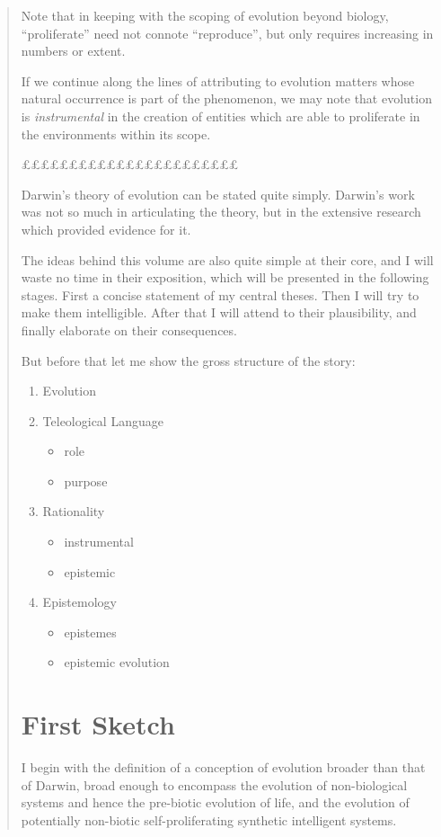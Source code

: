 {\begin{quote}
Note that in keeping with the scoping of evolution beyond biology, ``proliferate'' need not connote ``reproduce'', but only requires increasing in numbers or extent.

If we continue along the lines of attributing to evolution matters whose natural occurrence is part of the phenomenon, we may note that evolution is \emph{instrumental} in the creation of entities which are able to proliferate in the environments within its scope.

£££££££££££££££££££££££


Darwin's theory of evolution can be stated quite simply.
Darwin's work was not so much in articulating the theory, but in the extensive research which provided evidence for it.

The ideas behind this volume are also quite simple at their core, and I will waste no time in their exposition, which will be presented in the following stages.
First a concise statement of my central theses.
Then I will try to make them intelligible.
After that I will attend to their plausibility, and finally elaborate on their consequences.

But before that let me show the gross structure of the story:

\begin{enumerate}
\item Evolution
\item Teleological Language
\begin{itemize}
\item role
\item purpose
\end{itemize}
\item Rationality
\begin{itemize}
\item instrumental
\item epistemic
\end{itemize}
\item Epistemology
\begin{itemize}
\item epistemes
\item epistemic evolution
\end{itemize}
\end{enumerate}

\section{First Sketch}
I begin with the definition of a conception of evolution broader than that of Darwin, broad enough to encompass the evolution of non-biological systems and hence the pre-biotic evolution of life, and the evolution of potentially non-biotic self-proliferating synthetic intelligent systems.


\end{quote}}
